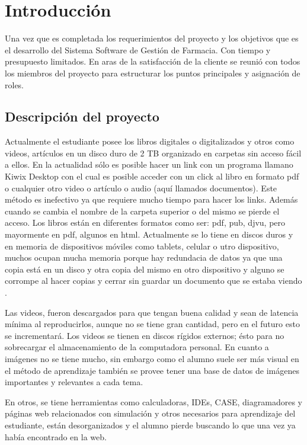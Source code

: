 
\chapter*{Introducción}
Una vez que es completada los requerimientos del proyecto y los objetivos que es el desarrollo del Sistema Software de Gestión de Farmacia. Con tiempo y presupuesto limitados. En aras de la satisfacción de la cliente se reunió con todos los miembros del proyecto para estructurar los puntos principales y asignación de roles. 

\section{Descripción del proyecto}
Actualmente el estudiante posee los libros digitales o digitalizados y otros como videos, artículos en un disco duro de 2 TB organizado en carpetas sin acceso fácil a ellos. En la actualidad sólo es
posible hacer un link con un programa llamano Kiwix Desktop con el cual es posible acceder con un click al libro en formato pdf o cualquier otro video o artículo o audio (aquí llamados documentos). Este método es inefectivo ya que requiere mucho tiempo para hacer los links. Además cuando se cambia el nombre de la carpeta superior o del mismo se pierde el acceso. 
Los libros están en diferentes formatos como ser: pdf, pub, djvu, pero mayormente en pdf, algunos en html. 
Actualmente se lo tiene en discos duros y en memoria de dispositivos móviles como tablets, celular o utro dispositivo, muchos ocupan mucha memoria porque hay redundacia de datos ya que una copia está en un disco y otra copia del mismo en otro dispositivo y alguno se corrompe al hacer copias y cerrar sin guardar un documento que se estaba viendo .

Las videos, fueron descargados para que tengan buena calidad y sean de latencia mínima al reproducirlos, aunque no se tiene gran cantidad, pero en el futuro esto se incrementará. Los videos se tienen en discos rígidos externos; ésto para no sobrecargar el almacenamiento de la computadora personal.
En cuanto a imágenes no se tiene mucho, sin embargo como el alumno suele ser más visual en el método de aprendizaje también se provee tener una base de datos de imágenes importantes y relevantes a cada tema.

En otros, se tiene herramientas como calculadoras, IDEs, CASE, diagramadores y páginas web relacionados con simulación y otros necesarios para aprendizaje del estudiante, están desorganizados y el alumno pierde buscando lo que una vez ya había encontrado en la web. 
